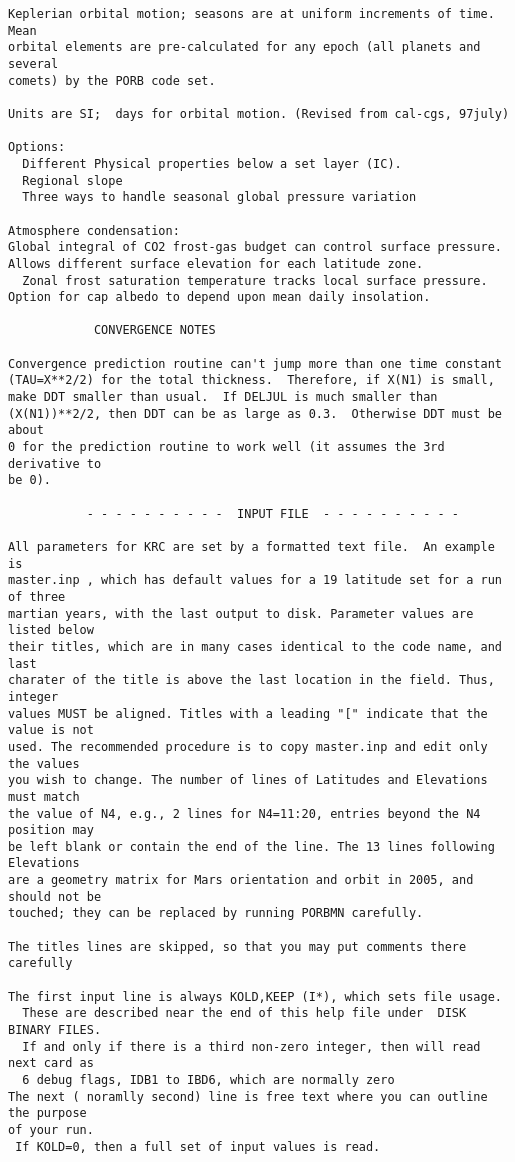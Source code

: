 \begin{verbatim}
Keplerian orbital motion; seasons are at uniform increments of time. Mean 
orbital elements are pre-calculated for any epoch (all planets and several
comets) by the PORB code set.

Units are SI;  days for orbital motion. (Revised from cal-cgs, 97july)

Options:
  Different Physical properties below a set layer (IC).
  Regional slope
  Three ways to handle seasonal global pressure variation

Atmosphere condensation: 
Global integral of CO2 frost-gas budget can control surface pressure.
Allows different surface elevation for each latitude zone.
  Zonal frost saturation temperature tracks local surface pressure.
Option for cap albedo to depend upon mean daily insolation.

			CONVERGENCE NOTES

Convergence prediction routine can't jump more than one time constant
(TAU=X**2/2) for the total thickness.  Therefore, if X(N1) is small,
make DDT smaller than usual.  If DELJUL is much smaller than 
(X(N1))**2/2, then DDT can be as large as 0.3.  Otherwise DDT must be about
0 for the prediction routine to work well (it assumes the 3rd derivative to
be 0).

           - - - - - - - - - -  INPUT FILE  - - - - - - - - - - 

All parameters for KRC are set by a formatted text file.  An example is
master.inp , which has default values for a 19 latitude set for a run of three
martian years, with the last output to disk. Parameter values are listed below
their titles, which are in many cases identical to the code name, and last
charater of the title is above the last location in the field. Thus, integer
values MUST be aligned. Titles with a leading "[" indicate that the value is not
used. The recommended procedure is to copy master.inp and edit only the values
you wish to change. The number of lines of Latitudes and Elevations must match
the value of N4, e.g., 2 lines for N4=11:20, entries beyond the N4 position may
be left blank or contain the end of the line. The 13 lines following Elevations
are a geometry matrix for Mars orientation and orbit in 2005, and should not be
touched; they can be replaced by running PORBMN carefully.

The titles lines are skipped, so that you may put comments there carefully

The first input line is always KOLD,KEEP (I*), which sets file usage.
  These are described near the end of this help file under  DISK BINARY FILES.
  If and only if there is a third non-zero integer, then will read next card as
  6 debug flags, IDB1 to IBD6, which are normally zero
The next ( noramlly second) line is free text where you can outline the purpose 
of your run. 
 If KOLD=0, then a full set of input values is read. 


\end{verbatim}
